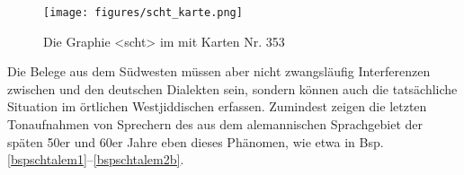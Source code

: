 \begin{figure}[h!]
		\centering
\texttt{[image: figures/scht\_karte.png]}
		\caption{\label{kartescht} Die Graphie <scht> im  mit  Karten Nr. 353}
		\end{figure}
\FloatBarrier


Die Belege aus dem Südwesten müssen aber nicht zwangsläufig Interferenzen zwischen  und den deutschen Dialekten sein, sondern können auch die tatsächliche Situation im örtlichen Westjiddischen erfassen. Zumindest zeigen die letzten Tonaufnahmen von Sprechern des  aus dem alemannischen Sprachgebiet der späten 50er und 60er Jahre eben dieses Phänomen, wie etwa in Bsp. \ref{bspschtalem1}–\ref{bspschtalem2b}.\\

 

